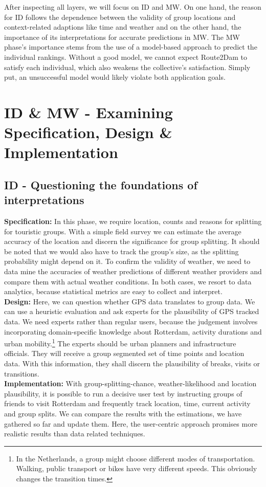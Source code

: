 \documentclass[11pt,a4paper,oneside]{article}
\begin{document}
After inspecting all layers, we will focus on ID and MW. On one hand, the reason for ID follows the dependence between the validity of group locations and context-related adaptions like time and weather and on the other hand, the importance of its interpretations for accurate predictions in MW. The MW phase's importance stems from the use of a model-based approach to predict the individual rankings. Without a good model, we cannot expect Route2Dam to satisfy each individual, which also weakens the collective's satisfaction. Simply put, an unsuccessful model would likely violate both application goals.    

\section{ID \& MW - Examining Specification, Design \& Implementation}

\subsection{ID - Questioning the foundations of interpretations}
\textbf{Specification:} In this phase, we require location, counts and reasons for splitting for touristic groups. With a simple field survey we can estimate the average accuracy of the location and discern the significance for group splitting. It should be noted that we would also have to track the group's size, as the splitting probability might depend on it. To confirm the validity of weather, we need to data mine the accuracies of weather predictions of different weather providers and compare them with actual weather conditions. In both cases, we resort to data analytics, because statistical metrics are easy to collect and interpret.\\ 
\textbf{Design:} Here, we can question whether GPS data translates to group data. We can use a heuristic evaluation and ask experts for the plausibility of GPS tracked data. We need experts rather than regular users, because the judgement involves incorporating domain-specific knowledge about Rotterdam, activity durations and urban mobility.\footnote{In the Netherlands, a group might choose different modes of transportation. Walking, public transport or bikes have very different speeds. This obviously changes the transition times.} The experts should be urban planners and infrastructure officials. They will receive a group segmented set of time points and location data. With this information, they shall discern the plausibility of breaks, visits or transitions.  \\
\textbf{Implementation:} With group-splitting-chance, weather-likelihood and location plausibility, it is possible to run a decisive user test by instructing groups of friends to visit Rotterdam and frequently track location, time, current activity and group splits. We can compare the results with the estimations, we have gathered so far and update them. Here, the user-centric approach promises more realistic results than data related techniques.
\end{document}
